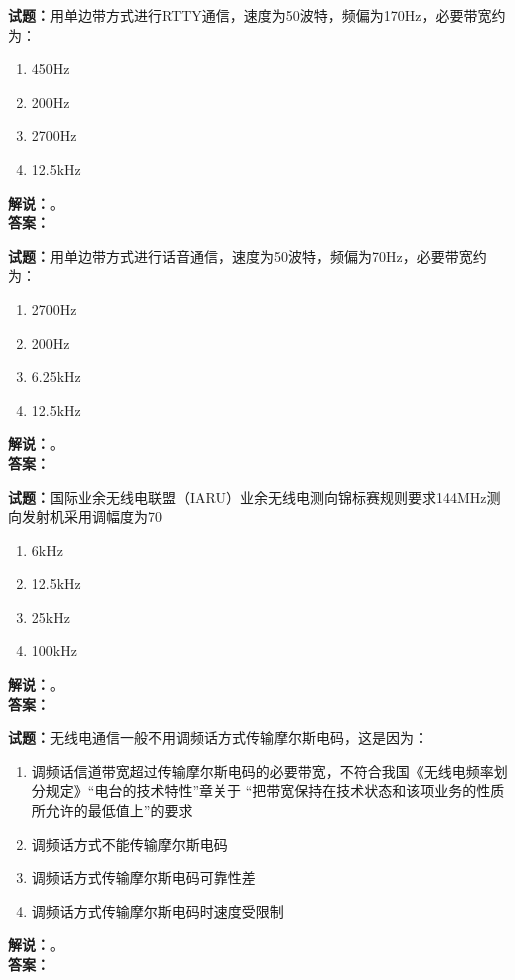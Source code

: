 \documentclass{ctexbook}
\begin{document}
\bigskip




\noindent\textbf{试题：}用单边带方式进行RTTY通信，速度为50波特，频偏为170Hz，必要带宽约为：
\begin{enumerate}[leftmargin=3em]
\item 450Hz
\item 200Hz
\item 2700Hz
\item 12.5\unit{\kHz}
\end{enumerate}
\noindent\textbf{解说：}\textbf{}。\\\noindent\textbf{答案：}

\bigskip




\noindent\textbf{试题：}用单边带方式进行话音通信，速度为50波特，频偏为70Hz，必要带宽约为：
\begin{enumerate}[leftmargin=3em]
\item 2700Hz
\item 200Hz
\item 6.25\unit{\kHz}
\item 12.5\unit{\kHz}
\end{enumerate}
\noindent\textbf{解说：}\textbf{}。\\\noindent\textbf{答案：}

\bigskip




\noindent\textbf{试题：}国际业余无线电联盟（IARU）业余无线电测向锦标赛规则要求144\unit{\MHz}测向发射机采用调幅度为70%
\begin{enumerate}[leftmargin=3em]
\item 6\unit{\kHz}
\item 12.5\unit{\kHz}
\item 25\unit{\kHz}
\item 100\unit{\kHz}
\end{enumerate}
\noindent\textbf{解说：}\textbf{}。\\\noindent\textbf{答案：}

\bigskip




\noindent\textbf{试题：}无线电通信一般不用调频话方式传输摩尔斯电码，这是因为：
\begin{enumerate}[leftmargin=3em]
\item 调频话信道带宽超过传输摩尔斯电码的必要带宽，不符合我国《无线电频率划分规定》“电台的技术特性”章关于 “把带宽保持在技术状态和该项业务的性质所允许的最低值上”的要求
\item 调频话方式不能传输摩尔斯电码
\item 调频话方式传输摩尔斯电码可靠性差
\item 调频话方式传输摩尔斯电码时速度受限制
\end{enumerate}
\noindent\textbf{解说：}\textbf{}。\\\noindent\textbf{答案：}
\end{document}
